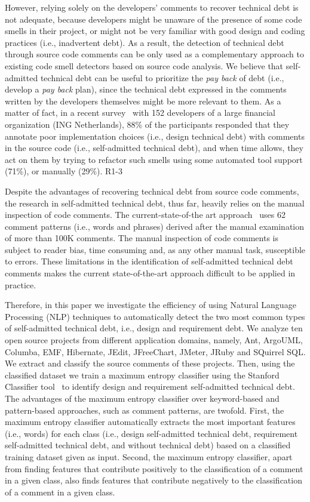 \documentclass[10pt,journal,compsoc]{IEEEtran}
\newcommand{\SATD}{self-admitted technical debt\xspace}
\newcommand{\revised}[2]{{#1}}
\begin{document}
{However, relying solely on the developers' comments to recover technical debt is not adequate, because developers might be unaware of the presence of some code smells in their project, or might not be very familiar with good design and coding practices (i.e., inadvertent debt).
As a result, the detection of technical debt through source code comments can be only used as a complementary approach to existing code smell detectors based on source code analysis.
We believe that \SATD can be useful to prioritize the \textit{pay back} of debt (i.e., develop a \textit{pay back} plan), since the technical debt expressed in the comments written by the developers themselves might be more relevant to them.
As a matter of fact, in a recent survey~\cite{Vassallo:ICSME:2016} with 152 developers of a large financial organization (ING Netherlands), 88\% of the participants responded that they annotate poor implementation choices (i.e., design technical debt) with comments in the source code (i.e., \SATD), 
and when time allows, they act on them by trying to refactor such smells using some automated tool support (71\%), or manually (29\%).
}{R1-3}


Despite the advantages of recovering technical debt from source code comments, the research in \SATD, thus far, heavily relies on the manual inspection of code comments. The current-state-of-the art approach~\cite{Potdar2014ICSME} uses 62 comment patterns (i.e., words and phrases) derived after the manual examination of more than 100K comments. The manual inspection of code comments is subject to reader bias, time consuming and, as any other manual task, susceptible to errors. These limitations in the identification of \SATD comments makes the current state-of-the-art approach difficult to be applied in practice.

Therefore, in this paper we investigate the efficiency of using Natural Language Processing (NLP) techniques to automatically detect the two most common types of \SATD, i.e., design and requirement debt. We analyze ten open source projects from different application domains, namely, Ant, ArgoUML, Columba, EMF, Hibernate, JEdit, JFreeChart, JMeter, JRuby and SQuirrel SQL. We extract and classify the source comments of these projects. Then, using the classified dataset we train a \revised{maximum entropy classifier using the Stanford Classifier tool}{R2-11}~\cite{manning2003optimization} to identify design and requirement \SATD.
The advantages of the \revised{maximum entropy classifier}{R2-11} over keyword-based and pattern-based approaches, such as comment patterns, are twofold. First, the \revised{maximum entropy classifier}{R2-11} automatically extracts the most important features (i.e., words) for each class (i.e., design \SATD, requirement \SATD, and without technical debt) based on a classified training dataset given as input. Second, the \revised{maximum entropy classifier}{R2-11}, apart from finding features that contribute positively to the classification of a comment in a given class, also finds features that contribute negatively to the classification of a comment in a given class.
\end{document}
